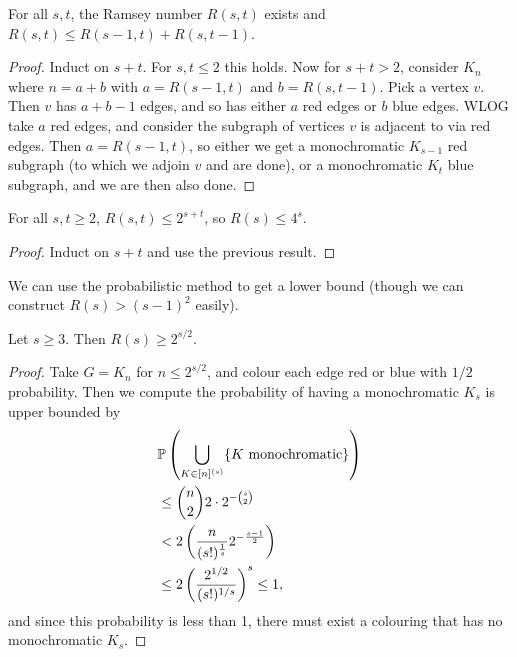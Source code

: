 \documentclass[a3paper, 10pt]{article}
\begin{document}
\begin{multicols*}{5}
\begin{theorem}[Ramsey]
    For all $s, t$, the Ramsey number $R(s, t)$ exists and $R(s, t) \leq R(s - 1, t) + R(s, t - 1)$.
\end{theorem}
\begin{proof}
    Induct on $s + t$. For $s, t \leq 2$ this holds. Now for $s + t > 2$, consider $K_n$ where $n = a + b$ with $a = R(s - 1, t)$ and $b = R(s, t - 1)$. Pick a vertex $v$. Then $v$ has $a + b - 1$ edges, and so has either $a$ red edges or $b$ blue edges. WLOG take $a$ red edges, and consider the subgraph of vertices $v$ is adjacent to via red edges. Then $a = R(s - 1, t)$, so either we get a monochromatic $K_{s - 1}$ red subgraph (to which we adjoin $v$ and are done), or a monochromatic $K_t$ blue subgraph, and we are then also done.
\end{proof}

\begin{corollary}
For all $s, t \geq 2$, $R(s, t) \leq 2^{s + t}$, so $R(s) \leq 4^s$.
\end{corollary}
\begin{proof}
    Induct on $s + t$ and use the previous result.
\end{proof}

We can use the probabilistic method to get a lower bound (though we can construct $R(s) > (s - 1)^2$ easily).

\begin{theorem}
    Let $s \geq 3$. Then $R(s) \geq 2^{s/2}$.    
\end{theorem}
\begin{proof}
    Take $G = K_n$ for $n \leq 2^{s/2}$, and colour each edge red or blue with $1/2$ probability. Then we compute the probability of having a monochromatic $K_s$ is upper bounded by
    \begin{align*}
    &    \mathbb{P}\left(\bigcup_{K \in [n]^{(s)}} \{K \text{ monochromatic}\}\right) \\
    &\leq \binom{n}{2} 2 \cdot 2^{- \binom{s}{2}} \\
    &< 2\left(\frac{n}{(s!)^{\frac{1}{s}}} 2^{- \frac{s - 1}{2}}\right) \\
    &\leq 2 \left(\frac{2^{1/2}}{(s!)^{1/s}}\right)^s \leq 1,
    \end{align*}
    and since this probability is less than 1, there must exist a colouring that has no monochromatic $K_s$.
\end{proof}


\end{multicols*}
\end{document}
